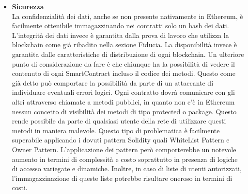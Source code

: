 \begin{itemize}
    Lo studio Gartner\footcite{farah:The-Dawn-of-Decentralized-Identity} evidenzia come in una rete permissionless la tracciabilità temporale non sia possibile, questo perchè in una rete distribuita ogni nodo può avere un concetto di tempo proprio. Questo però non risulta possibile in nessun approccia risolutivo all’ITF basato su blockchain, infatti le reti permissioned applicano timestamp a livello di blocco e non di transazione. Anche ammettendo che ci sia un concetto di tempo comune tra i nodi, le transizioni rimarrebbero temporalmente non tracciabili. La cosa potrebbe permettere ad un blocco di alterare l’ordine delle transazioni. 
    Tale complicazione in una rete permissioned può essere superata creando blocchi immutabili e ogni qual volta si voglia fare una modifica, si dovrà creare un nuovo blocco. In questo modo ci sarà solo una transazione di creazione blocco il cui timestamp coinciderà con il timestamp del blocco.
    L' approccio in Ethereum rimane in ogni caso impraticabile. Attualmente non sono note ulteriori tecniche per la tracciabilità temporale in Ethereum, motivo per cui l’attribuzione di un riferimento temporale dovrà essere effettuato lato client, con i conseguenti limiti di sicurezza. 
    \item \textbf{Sicurezza}\\
    La confidenzialità dei dati, anche se non presente nativamente in Ethereum, è facilmente ottenibile immagazzinando nei contratti solo un hash dei dati.
    L’integrità dei dati invece è garantita dalla prova di lavoro che utilizza la blockchain come già ribadito nella sezione Fiducia.
    La disponibilità invece è garantita dalle caratteristiche di distribuzione di ogni blockchain.
    Un ulteriore punto di considerazione da fare è che chiunque ha la possibilità di vedere il contenuto di ogni SmartContract incluso il codice dei metodi. Questo come già detto può comportare la possibilità da parte di un attaccante di individuare eventuali errori logici. Ogni contratto dovrà comunicare con gli altri attraverso chiamate a metodi pubblici, in quanto non c’è in Ethereum nessun concetto di visibilità dei metodi di tipo protected o package. Questo rende possibile da parte di qualsiasi utente della rete di utilizzare questi metodi in maniera malevole. Questo tipo di problematica è facilmente superabile applicando i dovuti pattern Solidity quali WhiteList Pattern e Owner Pattern. L’applicazione dei pattern però comporterebbe un notevole aumento in termini di complessità e costo soprattutto in presenza di logiche di accesso variegate e dinamiche. Inoltre, in caso di liste di utenti autorizzati, l'immagazzinazione di queste liste potrebbe risultare oneroso in termini di costi.

\end{itemize}
